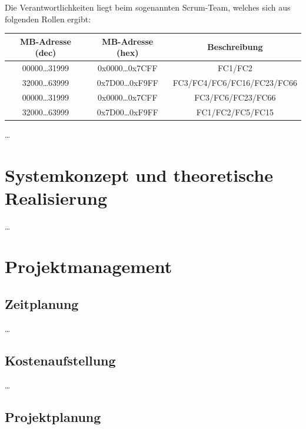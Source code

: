 Die Verantwortlichkeiten liegt beim sogenannten Scrum-Team, welches sich aus folgenden Rollen ergibt:

\begin{center}
	\begin{tabular}{ ccc }
	\toprule
	  {MB-Adresse (dec)} &
	  \multicolumn{1}{c}{MB-Adresse (hex)} &
	  \multicolumn{1}{c}{Beschreibung}\\
	
	\midrule
	00000\dots31999 & 0x0000\dots 0x7CFF & FC1/FC2 \\
	32000\dots63999 & 0x7D00\dots 0xF9FF & FC3/FC4/FC6/FC16/FC23/FC66 \\
	00000\dots31999 & 0x0000\dots 0x7CFF & FC3/FC6/FC23/FC66 \\
	32000\dots63999 & 0x7D00\dots 0xF9FF & FC1/FC2/FC5/FC15 \\
	\bottomrule
	\end{tabular}
	 \label{tab:scrumrollen} 
\end{center}


\ldots


\section{Systemkonzept und theoretische Realisierung} \label{Systemkonzept und theoretische Realisierung}

\ldots


\section{Projektmanagement} \label{Projektmanagement}
\subsection{Zeitplanung} \label{Zeitplanung}

\ldots



\subsection{Kostenaufstellung} \label{Kostenaufstellung}

\ldots

\subsection{Projektplanung} \label{Projektplanung}


